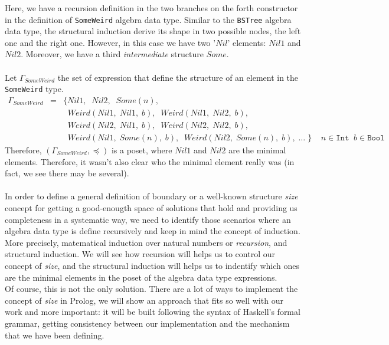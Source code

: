 \documentclass{report}
\theoremstyle{definition}
\theoremstyle{definition}
\newcommand{\ttt}[1]{\texttt{#1}}
\newcommand{\tav}{\;\;}
\begin{document}
Here, we have a recursion definition in the two branches on the forth constructor in the definition of \ttt{SomeWeird} algebra data type. Similar to the \ttt{BSTree} algebra data type, the structural induction derive its shape in two possible nodes, the left one and the right one. However, in this case we have two '$Nil$' elements: $Nil1$ and $Nil2$. Moreover, we have a third \textit{intermediate} structure $Some$.\\\\
Let $\Gamma_{SomeWeird}$ the set of expression that define the structure of an element in the \ttt{SomeWeird} type.
\begin{eqnarray*}
	\Gamma_{SomeWeird} & = & \{ Nil1, \tav Nil2, \tav Some(n), \\
					&& \tav Weird(Nil1, \; Nil1, \; b), \tav Weird(Nil1, \; Nil2, \; b), \\
					&& \tav Weird(Nil2, \; Nil1, \; b), \tav Weird(Nil2, \; Nil2, \; b),  \\
					&& \tav Weird(Nil1, \; Some(n), \; b), \tav Weird(Nil2, \; Some(n), \; b), \; \ldots \; \} \tav \tav n \in \ttt{Int} \tav b \in \ttt{Bool}
\end{eqnarray*}
Therefore, $(\Gamma_{SomeWeird}, \preceq)$ is a poset, where $Nil1$ and $Nil2$ are the minimal elements. Therefore, it wasn't also clear who the minimal element really was (in fact, we see there may be several).\\\\
In order to define a general definition of boundary or a well-known structure \textit{size} concept for getting a good-enougth space of solutions that hold and providing us completeness in a systematic way, we need to identify those scenarios where an algebra data type is define recursively and keep in mind the concept of induction. More precisely, matematical induction over natural numbers or \textit{recursion}, and structural induction. We will see how recursion will helps us to control our concept of \textit{size}, and the structural induction will helps us to indentify which ones are the minimal elements in the poset of the algebra data type expressions.\\

Of course, this is not the only solution. There are a lot of ways to implement the concept of \textit{size} in Prolog, we will show an approach that fits so well with our work and more important: it will be built following the syntax of Haskell's formal grammar, getting consistency between our implementation and the mechanism that we have been defining.\\\\
\pagebreak
\end{document}
